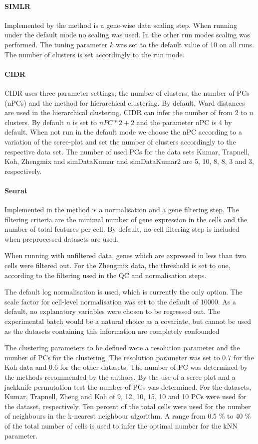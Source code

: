 \documentclass[11pt, a4paper]{article}\usepackage[]{graphicx}\usepackage[]{color}
\begin{document}
\paragraph{SIMLR}
Implemented by the method is a gene-wise data scaling step. When running under the default mode no scaling was used. In the other run modes scaling was performed.
The tuning parameter $k$ was set to the default value of 10 on all runs. The number of clusters is set accordingly to the run mode.
\paragraph{CIDR}
CIDR uses three parameter settings; the number of clusters, the number of PCs (nPCs) and the method for hierarchical clustering. By default, Ward distances are used in the hierarchical clustering. CIDR can infer the number of from 2 to $n$ clusters. By default $n$ is set to $nPC*2+2$ and the parameter nPC is 4 by default.
 When not run in the default mode we choose the nPC according to a variation of the scree-plot and set the number of clusters accordingly to the respective data set. 
The number of used PCs for the data sets Kumar, Trapnell, Koh, Zhengmix and simDataKumar and simDataKumar2 are  5, 10, 8, 8, 3 and 3, respectively.

\paragraph{Seurat}
Implemented in the method is a normalisation and a gene filtering step. The filtering criteria are the minimal number of gene expression in the cells and the number of total features per cell. By default, no cell filtering step is included when preprocessed datasets are used.

When running with unfiltered data, genes which are expressed in less than two cells were filtered out. For the Zhengmix data, the threshold is set to one, according to the filtering used in the QC and normalisation steps.

The default log normalisation is used, which is currently the only option. The scale factor for cell-level normalisation was set to the default of 10000. 
As a default, no explanatory variables were chosen to be regressed out. The experimental batch would be a natural choice as a covariate, but cannot be used as the datasets containing this information are completely confounded

The clustering parameters to be defined were a resolution parameter and the number of PCs for the clustering. The resolution parameter was set to 0.7 for the Koh data and 0.6 for the other datasets.
The number of PC was determined by the methods recommended by the authors. By the use of a scree plot and a jackknife permutation test the number of PCs was determined. 
For the datasets, Kumar, Trapnell, Zheng and Koh of  9, 12, 10, 15, 10 and 10 PCs were used for the dataset, respectively.
Ten percent of the total cells were used for the number of neighbours in the k-nearest neighbour algorithm.  A range from 0.5 \% to 40 \% of the total number of cells is used to infer the optimal number for the kNN parameter.
\end{document}
